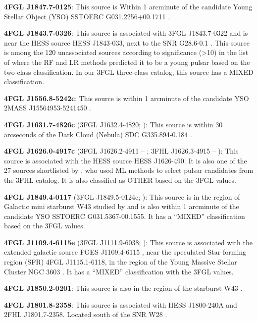 \documentclass[referee]{aa} %
\begin{document}
\textbf{4FGL J1847.7-0125}: This source is Within 1 arcminute of the candidate Young Stellar Object (YSO) SSTOERC G031.2256+00.1711 \citep{2017ApJ...839..108S}.

\textbf{4FGL J1843.7-0326}: This source is associated with 3FGL J1843.7-0322 and is near the HESS source HESS J1843-033, next to the SNR G28.6-0.1 \citep{2018A&A...612A...1H}. This source is
among the 120 unassociated sources according to significance (>10) in the list of \citet{2016ApJ...820....8S} where the RF and LR methods predicted it to be a young pulsar based on the two-class classification. 
In our 3FGL three-class catalog, this source has a MIXED classification.

\textbf{4FGL J1556.8-5242c}: This source is within 1 arcminute of the candidate YSO 2MASS J15564953-5241450 \citep{2008AJ....136.2413R}.

\textbf{4FGL J1631.7-4826c} (3FGL J1632.4-4820; \citealt{2015ApJS..218...23A}): This source is within 30 arcseconds of the Dark Cloud (Nebula) SDC G335.894-0.184 \citep{2016A&A...590A..72P}.

\textbf{4FGL J1626.0-4917c} (3FGL J1626.2-4911 -- \citealt{2015ApJS..218...23A}; 3FHL J1626.3-4915 -- \citealt{2017ApJS..232...18A}): 
This source is associated with the HESS source HESS J1626-490. It is also one of the 27 sources shortlisted by \citet{2020MNRAS.495.1093H}, 
who used ML methods to select pulsar candidates from the 3FHL catalog. It is also classified as OTHER based on the 3FGL values.

\textbf{4FGL J1849.4-0117} (3FGL J1849.5-0124c; \citealt{2015ApJS..218...23A}): This source is in the region of Galactic mini starburst W43 studied by \citet{2020A&A...640A..60Y} and is also within 1 arcminute of the candidate YSO SSTOERC G031.5367-00.1555. It has a ``MIXED'' classification based on the 3FGL values.

\textbf{4FGL J1109.4-6115e} (3FGL J1111.9-6038; \citealt{2015ApJS..218...23A}): This source is associated with the extended galactic source FGES J1109.4-6115 \citep{2017ApJ...843..139A}, near the speculated Star forming region (SFR) 4FGL J1115.1-6118, in the region of the Young Massive Stellar Cluster NGC 3603 \citep{2020ApJ...897..131S}. It has a ``MIXED'' classification with the 3FGL values.

\textbf{4FGL J1850.2-0201}: This source is also in the region of the starburst W43 \citep{2020A&A...640A..60Y}.

\textbf{4FGL J1801.8-2358}: This source is associated with HESS J1800-240A and 2FHL J1801.7-2358. Located south of the SNR W28 \citep{2020MNRAS.495.2909R}.
\end{document}
